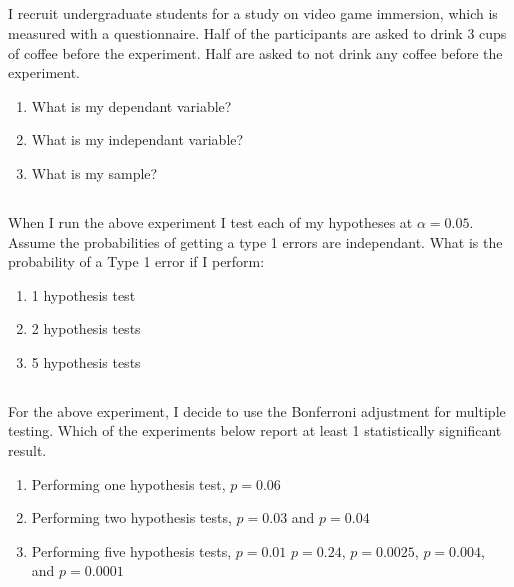 \documentclass[twocolumn]{article}
\begin{document}
\subsection{}

    I recruit undergraduate students for a study on video game immersion, which is measured with a questionnaire. Half of the participants are asked to drink 3 cups of coffee before the experiment. Half are asked to not drink any coffee before the experiment.
    
    \begin{enumerate}
        \item What is my dependant variable?
        \item What is my independant variable?
        \item What is my sample?
    \end{enumerate}

\subsection{}

When I run the above experiment I test each of my hypotheses at $\alpha = 0.05$. Assume the probabilities of getting a type 1 errors are independant. What is the probability of a Type 1 error if I perform:

\begin{enumerate}
    \item 1 hypothesis test
    \item 2 hypothesis tests
    \item 5 hypothesis tests
\end{enumerate}

\subsection{}

For the above experiment, I decide to use the Bonferroni adjustment for multiple testing. Which of the experiments below report at least 1 statistically significant result.

\begin{enumerate}
    \item Performing one hypothesis test, $ p = 0.06 $
    \item Performing two hypothesis tests, $p = 0.03$ and $p=0.04 $
    \item Performing five hypothesis tests, $p = 0.01$ $p=0.24$, $p=0.0025$, $p=0.004$, and $p=0.0001$ 
\end{enumerate}
\end{document}
